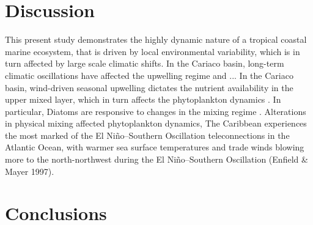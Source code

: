 \documentclass[draft]{agujournal2019}
\begin{document}
\section{Discussion}
This present study demonstrates the highly dynamic nature of a tropical coastal marine ecosystem, that is driven by local environmental variability, which is in turn affected by large scale climatic shifts. In the Cariaco basin, long-term climatic oscillations have affected the upwelling regime and ...
In the Cariaco basin, wind-driven seasonal upwelling dictates the nutrient availability in the upper mixed layer, which in turn affects the phytoplankton dynamics \cite{ptacnik_diversity_2008, bopp_response_2005}. In particular, Diatoms are responsive to changes in the mixing regime \cite{huisman_reduced_2006}.
Alterations in physical mixing affected phytoplankton dynamics,
The Caribbean experiences the most marked of the El Niño–Southern Oscillation teleconnections in the Atlantic Ocean, with warmer sea surface temperatures and trade winds blowing more to the north-northwest during the El Niño–Southern Oscillation (Enfield & Mayer 1997).


\section{Conclusions}






%
%
\end{document}
